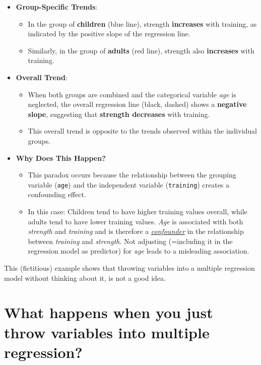 \documentclass[
]{book}
\providecommand{\tightlist}{%
  \setlength{\itemsep}{0pt}\setlength{\parskip}{0pt}}
\begin{document}
\begin{itemize}
\tightlist
\item
  \textbf{Group-Specific Trends}:

  \begin{itemize}
  \tightlist
  \item
    In the group of \textbf{children} (blue line), strength \textbf{increases} with training, as indicated by the positive slope of the regression line.
  \item
    Similarly, in the group of \textbf{adults} (red line), strength also \textbf{increases} with training.
  \end{itemize}
\item
  \textbf{Overall Trend}:

  \begin{itemize}
  \tightlist
  \item
    When both groups are combined and the categorical variable \emph{age} is neglected,
    the overall regression line (black, dashed) shows a \textbf{negative slope}, suggesting that \textbf{strength decreases} with training.
  \item
    This overall trend is opposite to the trends observed within the individual groups.
  \end{itemize}
\item
  \textbf{Why Does This Happen?}

  \begin{itemize}
  \tightlist
  \item
    This paradox occurs because the relationship between the grouping variable (\texttt{age}) and the independent variable (\texttt{training}) creates a confounding effect.
  \item
    In this case: Children tend to have higher training values overall,
    while adults tend to have lower training values. \emph{Age} is associated with both \emph{strength} and \emph{training} and
    is therefore a \href{https://en.wikipedia.org/wiki/Confounding}{\emph{confounder}} in the relationship between \emph{training} and \emph{strength}.
    Not adjusting (=including it in the regression model as predictor) for \emph{age} leads to a misleading association.
  \end{itemize}
\end{itemize}

This (fictitious) example shows that throwing variables into a multiple regression
model without thinking about it, is not a good idea.

\section{What happens when you just throw variables into multiple regression?}\label{throwing_variables}
\end{document}
